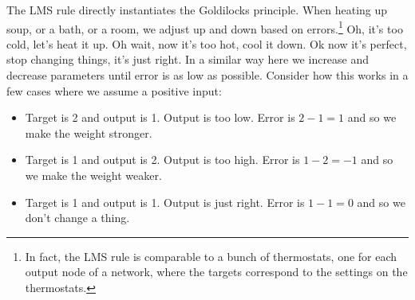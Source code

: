 
The LMS rule directly instantiates the Goldilocks principle. When heating up soup, or a bath, or a room, we adjust up and down based on errors.\footnote{In fact, the LMS rule is comparable to a bunch of thermostats, one for each output node of a network, where the targets correspond to the settings on the thermostats.} Oh, it's too cold, let's heat it up. Oh wait, now it's too hot, cool it down. Ok now it's perfect, stop changing things, it's just right. In a similar way here we increase and decrease parameters until error is as low as possible. Consider how this works in a few cases where we assume a positive input:
\begin{itemize}
\item Target is 2 and output is 1. Output is too low. Error is $2-1 = 1$ and so we make the weight stronger.
\item Target is 1 and output is 2. Output is too high. Error is $1-2 = -1$ and so we make the weight weaker.
\item Target is 1 and output is 1. Output is just right. Error is $1-1 = 0$ and so we don't change a thing.
\end{itemize}



